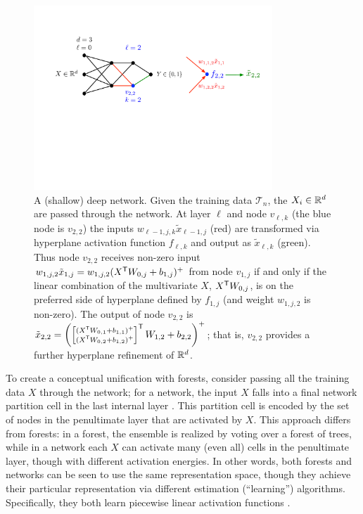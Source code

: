 \begin{figure}[htb]
\centering
\includegraphics[width=0.8\textwidth]{figures/network}
  \caption[]{A (shallow) deep network.
  Given the training data $\mathcal{T}_{n}$, the $X_i \in \mathbb{R}^d$ are passed through the network.
  At layer $\ell$ and node $v_{\ell,k}$ (the blue node is $v_{2,2}$) the inputs $w_{\ell-1,j,k} \tilde{x}_{\ell-1,j}$ (red) are transformed via hyperplane activation function $f_{\ell,k}$ and output as $\tilde{x}_{\ell,k}$ (green).
  Thus node $v_{2,2}$ receives non-zero input $w_{1,j,2} \tilde{x}_{1,j} = w_{1,j,2} (X^{\mathsf{T}} W_{0,j} + b_{1,j})^+$ from node $v_{1,j}$ if and only if the linear combination of the multivariate $X$, $X^{\mathsf{T}} W_{0,j}$, is on the preferred side of hyperplane defined by $f_{1,j}$ (and weight $w_{1,j,2}$ is non-zero).
  The output of node $v_{2,2}$ is 
  $\tilde{x}_{2,2} = \left( \left[\substack{(X^{\mathsf{T}} W_{0,1} + b_{1,1})^+\\(X^{\mathsf{T}} W_{0,2} + b_{1,2})^+}\right]^{\mathsf{T}} W_{1,2} + b_{2,2} \right)^+$; 
  that is, $v_{2,2}$ provides a further hyperplane refinement of $\mathbb{R}^d$.
  }
\label{fig:network}
\end{figure}

To create a conceptual unification with forests, consider passing all the training data $X$ through the network; for a network, the input $X$ falls into a final network partition cell in the last internal layer \citep{MPCB2014}.
This partition cell is encoded by the set of nodes in the penultimate layer that are activated by $X$.
% 
This approach differs from forests: in a forest, the ensemble is realized by voting over a forest of trees, while in a network each $X$ can activate many (even all) cells in the penultimate layer, though with different activation energies.
In other words, both forests and networks can be seen to use the same representation space, 
though they achieve their particular representation via different estimation (``learning'') algorithms. Specifically, they both learn piecewise linear activation functions \citep{Serra2018-bg, shi2019gradient, Rolnick2019-ei, Hanin2019-jx}.

